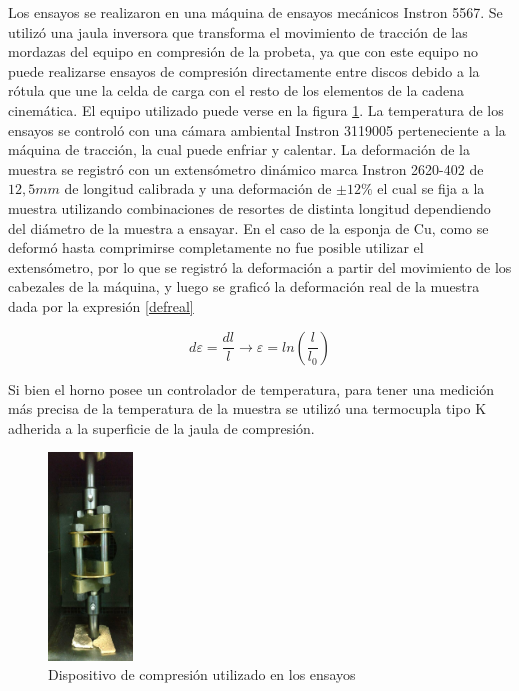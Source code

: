 \documentclass[a4paper,12pt,fleqn,twoside,openany]{book}
\begin{document}
Los ensayos se realizaron en una máquina de ensayos mecánicos Instron 5567. Se utilizó una jaula inversora que transforma el movimiento de tracción de las mordazas del equipo en compresión de la probeta, ya que con este equipo no puede realizarse ensayos de compresión directamente entre discos debido a la rótula que une la celda de carga con el resto de los elementos de la cadena cinemática. El equipo utilizado puede verse en la figura \ref{fig:jaula}. La 
temperatura de los ensayos se controló con una cámara ambiental Instron 3119005
perteneciente a la máquina de tracción, la cual puede enfriar y calentar.
La deformación de la muestra se registró con un extensómetro dinámico marca Instron 2620-402 de $12,5 mm$ de longitud calibrada y una deformación de $\pm 12\%$ el cual se fija a la muestra utilizando combinaciones de 
resortes de distinta longitud dependiendo del diámetro de la muestra a ensayar. En el caso de la esponja de Cu, como se deformó hasta comprimirse 
completamente no fue posible utilizar el extensómetro, por lo que se registró la deformación a partir del movimiento de los cabezales de la máquina, y luego 
se graficó la deformación real de la muestra dada por la expresión \ref{defreal}

\begin{equation}
d \varepsilon = \frac{dl}{l}  \longrightarrow  \varepsilon =ln \left(\frac{l}{l_0}\right) \label{defreal} 
\end{equation}



Si bien el horno posee un controlador de temperatura, para tener una medición
más precisa de la temperatura de la muestra se utilizó una termocupla tipo K adherida a la superficie de la jaula de compresión.

\begin{figure}
 \centering
 \includegraphics[width=0.2\textwidth]{Img/Procedimiento/jaula.jpg}
 \caption{Dispositivo de compresión utilizado en los ensayos} 
 \label{fig:jaula}
 \end{figure}
\end{document}
